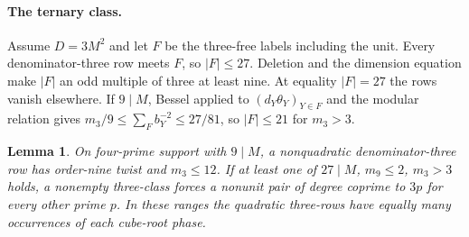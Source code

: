 \documentclass[11pt]{amsart}
\numberwithin{equation}{section}
\newtheorem{lemma}[theorem]{Lemma}
\theoremstyle{definition}
\theoremstyle{plain}
\begin{document}
\paragraph{The ternary class.}
Assume $D=3M^2$ and let $F$ be the three-free labels including the unit.
Every denominator-three row meets $F$, so $|F|\le27$. Deletion and
the dimension equation make $|F|$ an odd multiple of three at least nine.
At equality $|F|=27$ the rows vanish elsewhere. If $9\mid M$, Bessel
applied to $(d_Y\theta_Y)_{Y\in F}$ and the modular relation gives
$m_3/9\le\sum_F b_Y^{-2}\le27/81$, so $|F|\le21$ for $m_3>3$.

\begin{lemma}\label{result:ternary-cap}
On four-prime support with $9\mid M$, a nonquadratic denominator-three
row has order-nine twist and $m_3\le12$. If at least one of $27\mid M$, $m_9\le2$, $m_3>3$ holds, a
nonempty three-class forces a nonunit pair of degree coprime to $3p$ for
every other prime $p$. In these ranges the quadratic three-rows have
equally many occurrences of each cube-root phase.
\end{lemma}
\end{document}
